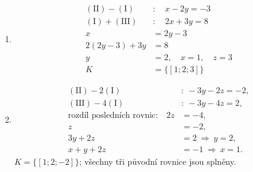 \documentclass[11pt,a4paper]{article}
\begin{document}
\begin{zadaniReseniBox}[title={Domácí úkol}]
\begin{enumerate}[label=\alph*)]
\item
\[\begin{aligned}
(\mathrm{II})-(\mathrm I)&:\quad x-2y=-3\\(\mathrm I)+(\mathrm{III})&:\quad 2x+3y=8\\x&=2y-3\\2(2y-3)+3y&=8\\y&=2,\quad x=1,\quad z=3\\K&=\{[1;2;3]\}
\end{aligned}\]

\item
\[\begin{aligned}
(\mathrm{II})-2(\mathrm I)&:\ -3y-2z=-2,\\
(\mathrm{III})-4(\mathrm I)&:\ -3y-4z=2,\\
\text{rozdíl posledních rovnic:}\quad2z&=-4,\\
z&=-2,\\
3y+2z&=2\ \Rightarrow\ y=2,\\
x+y+2z&=-1\ \Rightarrow\ x=1.
\end{aligned}\]
$K=\{[1;2;-2]\}$; všechny tři původní rovnice jsou splněny.
\end{enumerate}
\end{zadaniReseniBox}


\end{document}
